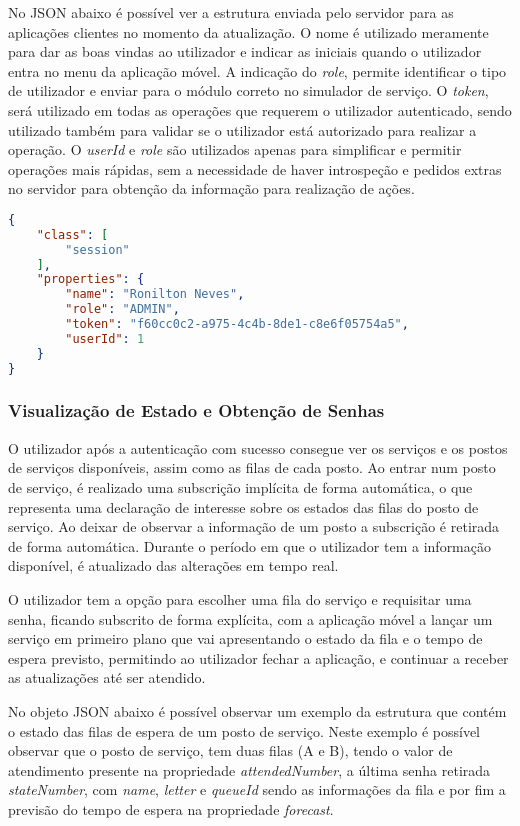 {No JSON abaixo é possível ver a estrutura enviada pelo servidor para as aplicações clientes no momento da atualização. O nome é utilizado meramente para dar as boas vindas ao utilizador e indicar as iniciais quando o utilizador entra no menu da aplicação móvel. A indicação do \textit{role}, permite identificar o tipo de utilizador e enviar para o módulo correto no simulador de serviço. O \textit{token}, será utilizado em todas as operações que requerem o utilizador autenticado, sendo utilizado também para validar se o utilizador está autorizado para realizar a operação. O \textit{userId} e \textit{role} são utilizados apenas para simplificar e permitir operações mais rápidas, sem a necessidade de haver introspeção e pedidos extras no servidor para obtenção da informação para realização de ações.

\begin{lstlisting}[language=json,firstnumber=1]
{
    "class": [
        "session"
    ],
    "properties": {
        "name": "Ronilton Neves",
        "role": "ADMIN",
        "token": "f60cc0c2-a975-4c4b-8de1-c8e6f05754a5",
        "userId": 1
    }
}
\end{lstlisting}

\subsubsection{Visualização de Estado e Obtenção de Senhas} 
O utilizador após a autenticação com sucesso consegue ver os serviços e os postos de serviços disponíveis, assim como as filas de cada posto. Ao entrar num posto de serviço, é realizado uma subscrição implícita de forma automática, o que representa uma declaração de interesse sobre os estados das filas do posto de serviço. Ao deixar de observar a informação de um posto a subscrição é retirada de forma automática. Durante o período em que o utilizador tem a informação disponível, é atualizado das alterações em tempo real. 

O utilizador tem a opção para escolher uma fila do serviço e requisitar uma senha, ficando subscrito de forma explícita, com a aplicação móvel a lançar um serviço em primeiro plano que vai apresentando o estado da fila e o tempo de espera previsto, permitindo ao utilizador fechar a aplicação, e continuar a receber as atualizações até ser atendido.

No objeto JSON abaixo é possível observar um exemplo da estrutura que contém o estado das filas de espera de um posto de serviço. Neste exemplo é possível observar que o posto de serviço, tem duas filas (A e B), tendo o valor de atendimento presente na propriedade \textit{attendedNumber}, a última senha retirada \textit{stateNumber}, com \textit{name}, \textit{letter} e \textit{queueId} sendo as informações da fila e por fim a previsão do tempo de espera na propriedade \textit{forecast}.

}
